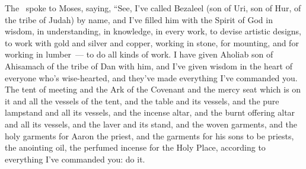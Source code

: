 
\begin{inparaenum}
   The \lord\ spoke to Moses, saying,%
   ``See, I've called Bezaleel (son of Uri, son of Hur, of the tribe of Judah) by name,%
   and I've filled him with the Spirit of God in wisdom, in understanding, in knowledge, in every work,%
   to devise artistic designs, to work with gold and silver and copper,%
   working in stone, for mounting, and for working in lumber~--- to do all kinds of work.%
   I have given Aholiab son of Ahisamach of the tribe of Dan with him, and I've given wisdom in the heart of everyone who's wise-hearted, and they've made everything I've commanded you.%
   The tent of meeting and the Ark of the Covenant and the mercy seat which is on it and all the vessels of the tent,%
   and the table and its vessels, and the pure lampstand and all its vessels, and the incense altar,%
   and the burnt offering altar and all its vessels, and the laver and its stand,%
   and the woven garments, and the holy garments for Aaron the priest, and the garments for his sons to be priests,%
   the anointing oil, the perfumed incense for the Holy Place, according to everything I've commanded you: do it.%
  

\end{inparaenum}
